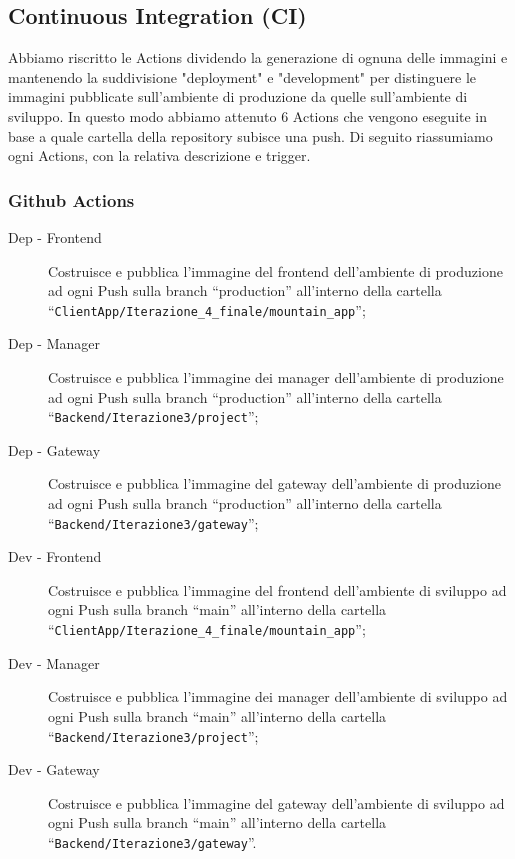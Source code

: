 \subsection{Continuous Integration (CI)}
Abbiamo riscritto le Actions dividendo la generazione di ognuna delle immagini e mantenendo la suddivisione "deployment" e "development" per distinguere le immagini pubblicate sull'ambiente di produzione da quelle sull'ambiente di sviluppo. In questo modo abbiamo attenuto 6 Actions che vengono eseguite in base a quale cartella della repository subisce una push. Di seguito riassumiamo ogni Actions, con la relativa descrizione e trigger.
\subsubsection{Github Actions}
\begin{description}
  \item[Dep - Frontend] Costruisce e pubblica l'immagine del frontend dell'ambiente di produzione ad ogni Push sulla branch ``production'' all'interno della cartella\\``\verb|ClientApp/Iterazione_4_finale/mountain_app|'';
  \item[Dep - Manager] Costruisce e pubblica l'immagine dei manager dell'ambiente di produzione ad ogni Push sulla branch ``production'' all'interno della cartella\\``\verb|Backend/Iterazione3/project|'';
  \item[Dep - Gateway] Costruisce e pubblica l'immagine del gateway dell'ambiente di produzione ad ogni Push sulla branch ``production'' all'interno della cartella\\``\verb|Backend/Iterazione3/gateway|'';
  \item[Dev - Frontend] Costruisce e pubblica l'immagine del frontend dell'ambiente di sviluppo ad ogni Push sulla branch ``main'' all'interno della cartella\\``\verb|ClientApp/Iterazione_4_finale/mountain_app|'';
  \item[Dev - Manager] Costruisce e pubblica l'immagine dei manager dell'ambiente di sviluppo ad ogni Push sulla branch ``main'' all'interno della cartella\\``\verb|Backend/Iterazione3/project|'';
  \item[Dev - Gateway] Costruisce e pubblica l'immagine del gateway dell'ambiente di sviluppo ad ogni Push sulla branch ``main'' all'interno della cartella\\``\verb|Backend/Iterazione3/gateway|''.
\label{tab: github-actions-finali}
\end{description}
\newpage

